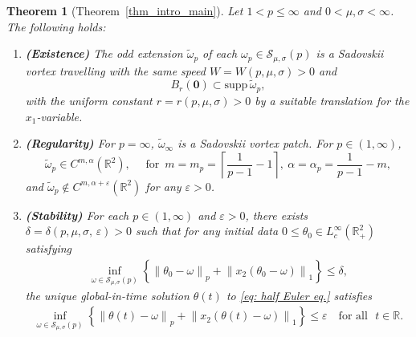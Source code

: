 \documentclass[11pt]{amsart}
\newtheorem{theorem}{Theorem}[section]
\theoremstyle{definition}
\theoremstyle{definition}
\numberwithin{equation}{section}
\newcommand{\tld}[1]{\widetilde{#1}}
\newcommand{\supp}{{\mathrm{supp}}\,}
\newcommand{\0}{\emptyset}
\newcommand{\bbR}{\mathbb R}
\newcommand{\calS}{\mathcal S}
\begin{document}
			
			\begin{theorem}[Theorem~\ref{thm_intro_main}]
				\label{thm_main_1}
				Let $1<p \leq \infty$ and $0<\mu,\sigma<\infty$. The following holds:
				
				\begin{enumerate}[itemsep=1em, topsep=1em]
					\item[(i)] \textbf{(Existence)} The odd extension $\tld{\omega}_p$ of each $\omega_p\in \calS_{\mu,\sigma}(p)$ is a Sadovskii vortex travelling with the same speed $W = W(p, \mu, \sigma) > 0$ and 
					\begin{equation}\label{eq_main_supp}
						B_{r}(\mathbf{0}) \subset \supp \tld{\omega}_p,
					\end{equation}
					with the uniform constant $ r = r(p, \mu, \sigma) >0$ by a suitable translation for the $x_1$-variable. 
					\item[(ii)] \textbf{(Regularity)} For $p=\infty$, $\tld{\omega}_{\infty}$ is a Sadovskii vortex patch. For $p \in (1, \infty)$, 
					\begin{equation}\label{eq_main_regularity}
						\tld{\omega}_p \in C^{m, \alpha}(\bbR^2), \quad \textrm{ for } \, m =m_p = \left\lceil \frac{1}{p-1} - 1 \right\rceil,\ \alpha = \alpha_p =\frac{1}{p-1}-m,
					\end{equation}
					and $\tld{\omega}_p \notin C^{m, \alpha + \varepsilon}(\bbR^2)$ for any $\varepsilon > 0$.
					\item[(iii)] \textbf{(Stability)} For each $p \in (1, \infty)$ and $\varepsilon>0$, there exists $\delta = \delta(p, {\mu, \sigma,\, }   \varepsilon)>0$ such that for any initial data $0 \le \theta_0 \in  L_c^{\infty}(\bbR^2_+)$ satisfying  
					\begin{align}
						\inf_{\omega\in \calS_{\mu,\sigma}(p)}\left\{  \left\| \theta_0-\omega \right\|_{p} 
						+\left\| x_2 \left( \theta_0-\omega \right) \right\|_{1} \right\}   \label{eq: initial}
						\leq  \delta,
					\end{align}
					the unique global-in-time solution $\theta(t)$ to 
                    {\eqref{eq: half Euler eq.}}
                    satisfies
					\begin{align} 
						\inf_{\omega\in \calS_{\mu,\sigma}(p)}\left\{   \left\| \theta \left( t \right)-\omega \right\|_{p}
						+\left\|x_2 \left( \theta \left(t \right)-\omega  \right) \right\|_{1}\right\}
						\leq  \varepsilon \quad \mbox{for all } \,\, t \in \bbR.   \label{eq: stability}
					\end{align} 
                   

\end{enumerate}
\end{theorem}
\end{document}
